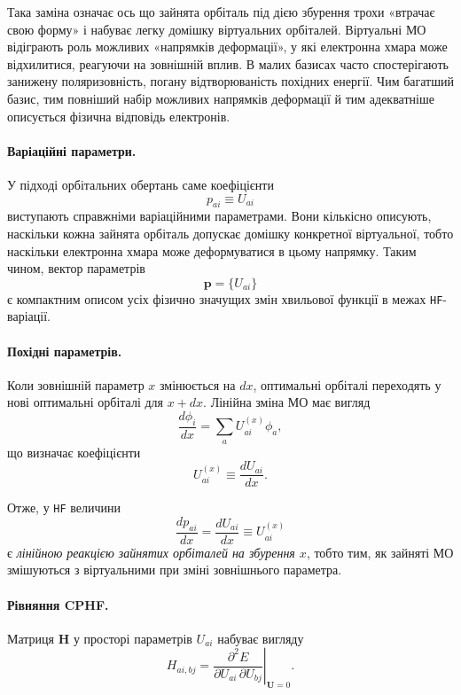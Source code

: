 \documentclass{PySCFBook}
\begin{document}
Така заміна означає ось що зайнята орбіталь під дією збурення трохи «втрачає свою форму» і набуває легку домішку віртуальних орбіталей. Віртуальні МО відіграють роль можливих «напрямків деформації», у які електронна хмара може відхилитися, реагуючи на зовнішній вплив. В малих базисах часто спостерігають занижену поляризовність, погану відтворюваність похідних енергії. Чим багатший базис, тим повніший набір можливих напрямків деформації й тим адекватніше описується фізична відповідь електронів.

\paragraph{Варіаційні параметри.}

У підході орбітальних обертань саме коефіцієнти
\begin{equation}\label{eq:p_HF_definition}
p_{ai} \equiv U_{ai}
\end{equation}
виступають справжніми варіаційними параметрами. Вони кількісно описують,
наскільки кожна зайнята орбіталь допускає домішку конкретної віртуальної,
тобто наскільки електронна хмара може деформуватися в цьому напрямку.
Таким чином, вектор параметрів
\[
\mathbf p = \{U_{ai}\}
\]
є компактним описом усіх фізично значущих змін хвильової функції
в межах \texttt{HF}-варіації.


\paragraph{Похідні параметрів.}
Коли зовнішній параметр $x$ змінюється на $dx$, оптимальні орбіталі
переходять у нові оптимальні орбіталі для $x+dx$.
Лінійна зміна МО має вигляд
\begin{equation}\label{eq:HF_MO_derivative}
\frac{d\phi_i}{dx}
=
\sum_a U_{ai}^{(x)} \phi_a ,
\end{equation}
що визначає коефіцієнти
\[
U_{ai}^{(x)} \equiv \frac{dU_{ai}}{dx}.
\]

Отже, у \texttt{HF} величини
\[
\frac{dp_{ai}}{dx}
=
\frac{dU_{ai}}{dx}
\equiv U_{ai}^{(x)}
\]
є \emph{лінійною реакцією зайнятих орбіталей на збурення $x$},
тобто тим, як зайняті МО змішуються з віртуальними при зміні зовнішнього параметра.

\paragraph{Рівняння CPHF.}
Матриця $\mathbf H$ у просторі параметрів $U_{ai}$ набуває вигляду
\begin{equation}\label{eq:H_ai_bj_def}
H_{ai,bj}
=
\left.\frac{\partial^2 E}{\partial U_{ai}\,\partial U_{bj}}\right|_{\mathbf U= 0}.
\end{equation}
\end{document}
